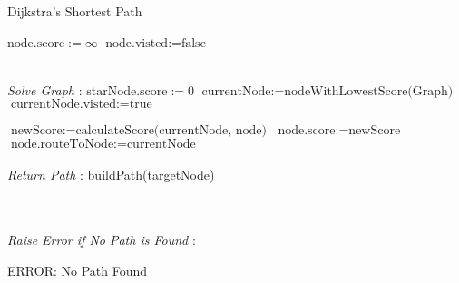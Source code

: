 \label{Dijkstra}
\begin{algorithm}
  \caption{Dijkstra's Shortest Path}
  \begin{algorithmic}[h!]
   \STATE $\text{node.score} := \infty$
   \STATE $\text{node.visted} := \text{false}$
   \ENDFOR

   \\ \textit{Solve Graph} :
   \STATE $\text{starNode.score} := 0$
  \STATE $\text{currentNode} := \text{nodeWithLowestScore(Graph)}$
  \STATE $\text{currentNode.visted} := \text{true}$

    \STATE $\text{newScore} := \text{calculateScore(currentNode, node)}$
    \STATE  $\text{node.score} := \text{newScore}$
    \STATE  $\text{node.routeToNode} := \text{currentNode}$
    \ENDIF
    \ENDIF
    \ENDFOR
    \\
    \\ \textit{Return Path} :
    \RETURN build{Path(targetNode)}
    \ENDIF

    \\
    \\ \textit{Raise Error if No Path is Found} :

    \RETURN ERROR: No Path Found
    \ENDIF

   \ENDWHILE

  \end{algorithmic} 
  \end{algorithm}